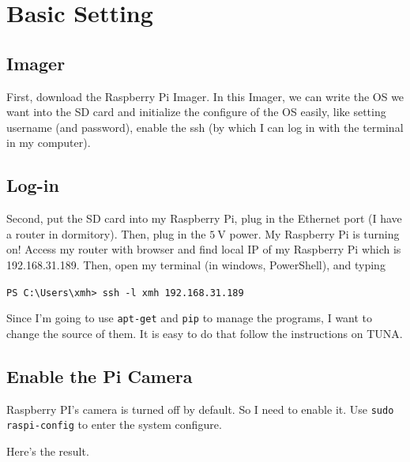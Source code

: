 \documentclass{article}
\begin{document}
\section{Basic Setting}

\label{sec:basicSetting}

\subsection{Imager}
First, download the Raspberry Pi Imager. In this Imager, we can write the OS we want into the SD card and initialize the configure of the OS easily, like setting username (and password), enable the ssh (by which I can log in with the terminal in my computer).

\subsection{Log-in}

Second, put the SD card into my Raspberry Pi, plug in the Ethernet port (I have a router in dormitory). Then, plug in the $5 ~\mathrm{V}$ power. My Raspberry Pi is turning on! Access my router with browser and find local IP of my Raspberry Pi which is 192.168.31.189. Then, open my terminal (in windows, PowerShell), and typing

\begin{center}
\verb|PS C:\Users\xmh> ssh -l xmh 192.168.31.189|
\end{center}

Since I'm going to use \verb|apt-get| and \verb|pip| to manage the programs, I want to change the source of them. It is easy to do that follow the instructions on TUNA\cite{tuna}.

\subsection{Enable the Pi Camera}
Raspberry PI's camera is turned off by default. So I need to enable it. Use \verb|sudo raspi-config| to enter the system configure.

Here's the result.
\end{document}
